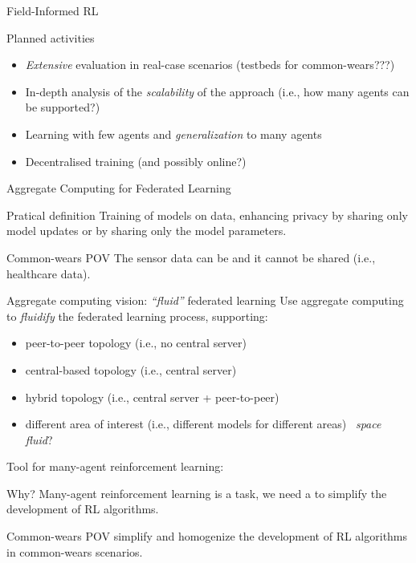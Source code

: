 \documentclass[presentation, 9pt, aspectratio=169]{beamer}\mode<presentation>{\usetheme{AMSBolognaFC}}
\begin{document}
\begin{frame}{Field-Informed RL}
	\begin{exampleblock}{Planned activities}
		\begin{itemize}
			\item \emph{Extensive} evaluation in real-case scenarios (testbeds for common-wears???)
			\item In-depth analysis of the \emph{scalability} of the approach (i.e., how many agents can be supported?)
			\item Learning with few agents and \emph{generalization} to many agents
			\item Decentralised training (and possibly online?)
		\end{itemize}
	\end{exampleblock}
\end{frame}
\begin{frame}{Aggregate Computing for Federated Learning}
	\begin{alertblock}{Pratical definition}
		Training of  models on  data, enhancing privacy by sharing only model updates or by sharing only the model parameters.
	\end{alertblock}
	\begin{exampleblock}{Common-wears POV}
		The sensor data can be  and it cannot be shared (i.e., healthcare data).
	\end{exampleblock}
	\begin{exampleblock}{Aggregate computing vision: \emph{``fluid''} federated learning}
		Use aggregate computing to \emph{fluidify} the federated learning process, supporting:
		\begin{itemize}
			\item peer-to-peer topology (i.e., no central server)
			\item central-based topology (i.e., central server)
			\item hybrid topology (i.e., central server + peer-to-peer)
			\item different area of interest (i.e., different models for different areas) \faArrowRight \, \emph{space fluid}?
		\end{itemize}
	\end{exampleblock}
\end{frame}

\begin{frame}{Tool for many-agent reinforcement learning: }
	\begin{alertblock}{Why?}
		Many-agent reinforcement learning is a  task, we need a  to simplify the development of RL algorithms.
	\end{alertblock}
	\begin{exampleblock}{Common-wears POV}
		simplify and homogenize the development of RL algorithms in common-wears scenarios.
	\end{exampleblock}
\end{frame}
\end{document}
